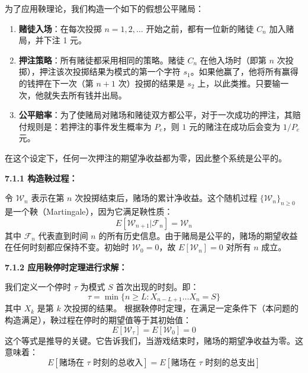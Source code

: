\documentclass[UTF8]{ctexart}
\begin{document}
为了应用鞅理论，我们构造一个如下的假想公平赌局：
\begin{enumerate}
    \item \textbf{赌徒入场}：在每次投掷 $n=1, 2,  \dots$ 开始之前，都有一位新的赌徒 $C_n$ 加入赌局，并下注 1 元。
    \item \textbf{押注策略}：所有赌徒都采用相同的策略。赌徒 $C_n$ 在他入场时（即第 $n$ 次投掷），押注该次投掷结果为模式的第一个字符 $s_1$。如果他赢了，他将所有赢得的钱押在下一次（第 $n+1$ 次）投掷的结果是 $s_2$ 上，以此类推。只要输一次，他就失去所有钱并出局。
    \item \textbf{公平赔率}：为了使赌局对赌场和赌徒双方都公平，对于一次成功的押注，其赔付规则是：若押注的事件发生概率为 $P_e$，则 $1$ 元的赌注在成功后会变为 $1/P_e$ 元。
\end{enumerate}
在这个设定下，任何一次押注的期望净收益都为零，因此整个系统是公平的。


\textbf{7.1.1 构造鞅过程：}

令 $\mathcal{W}_n$ 表示在第 $n$ 次投掷结束后，赌场的累计净收益。这个随机过程 $\{\mathcal{W}_n\}_{n \ge 0}$ 是一个鞅（Martingale），因为它满足鞅性质：
$$ E[\mathcal{W}_{n+1} | \mathcal{F}_n] = \mathcal{W}_n $$
其中 $\mathcal{F}_n$ 代表直到时间 $n$ 的所有历史信息。由于赌局是公平的，赌场的期望收益在任何时刻都应保持不变。初始时 $\mathcal{W}_0 = 0$，故 $E[\mathcal{W}_n] = 0$ 对所有 $n$ 成立。

\textbf{7.1.2 应用鞅停时定理进行求解：}

我们定义一个停时 $\tau$ 为模式 $S$ 首次出现的时刻。即：
$$ \tau = \min\{ n \ge L : X_{n-L+1} \dots X_n = S \} $$
其中 $X_k$ 是第 $k$ 次投掷的结果。
根据鞅停时定理，在满足一定条件下（本问题的构造满足），鞅过程在停时的期望值等于其初始值：
$$ E[\mathcal{W}_\tau] = E[\mathcal{W}_0] = 0 $$
这个等式是推导的关键。它告诉我们，当游戏结束时，赌场的期望净收益为零。这意味着：
$$ E[\text{赌场在 }\tau\text{ 时刻的总收入}] = E[\text{赌场在 }\tau\text{ 时刻的总支出}] $$
\end{document}
